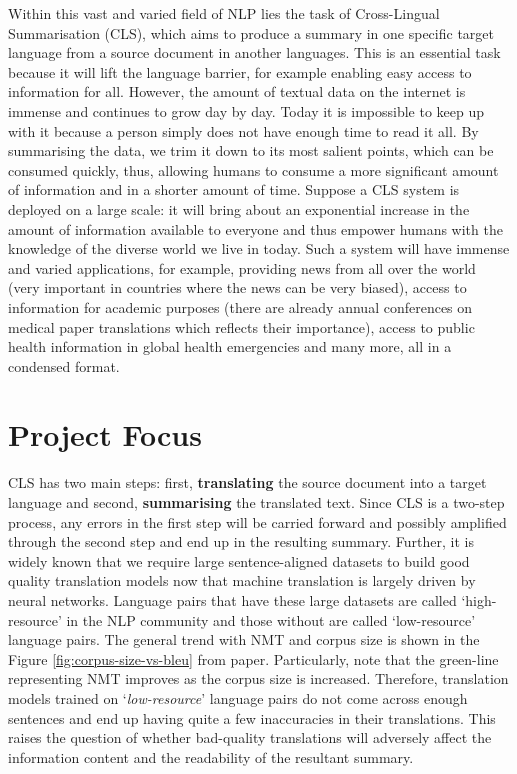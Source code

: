 \documentclass[12pt,a4paper,twoside,openright]{report}
\begin{document}
Within this vast and varied field of NLP lies the task of Cross-Lingual Summarisation (CLS), which aims to produce a summary in one specific target language from a source document in another languages. This is an essential task because it will lift the language barrier, for example enabling easy access to information for all. However, the amount of textual data on the internet is immense and continues to grow day by day. Today it is impossible to keep up with it because a person simply does not have enough time to read it all. By summarising the data, we trim it down to its most salient points, which can be consumed quickly, thus, allowing humans to consume a more significant amount of information and in a shorter amount of time.  Suppose a CLS system is deployed on a large scale: it will bring about an exponential increase in the amount of information available to everyone and thus empower humans with the knowledge of the diverse world we live in today. Such a system will have immense and varied applications, for example, providing news from all over the world (very important in countries where the news can be very biased), access to information for academic purposes (there are already annual conferences on medical paper translations which reflects their importance), access to public health information in global health emergencies and many more, all in a condensed format.

\section{Project Focus}
\label{project-focus}

CLS has two main steps: first, \textbf{translating} the source document into a target language and second, \textbf{summarising} the translated text. Since CLS is a two-step process, any errors in the first step will be carried forward and possibly amplified through the second step and end up in the resulting summary. Further, it is widely known that we require large sentence-aligned datasets to build good quality translation models now that machine translation is largely driven by neural networks. Language pairs that have these large datasets are called `high-resource' in the NLP community and those without are called `low-resource' language pairs. The general trend with NMT and corpus size is shown in the Figure \ref{fig:corpus-size-vs-bleu} from paper\cite{translation-six}. Particularly, note that the green-line representing NMT improves as the corpus size is increased. Therefore, translation models trained on `\textit{low-resource}' language pairs do not come across enough sentences and end up having quite a few inaccuracies in their translations. This raises the question of whether bad-quality translations will adversely affect the information content and the readability of the resultant summary.
\end{document}
